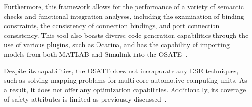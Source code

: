 Furthermore, this framework allows for the performance of a variety of semantic checks and functional integration analyses, including the examination of binding constraints, the consistency of connection bindings, and port connection consistency. This tool also boasts diverse code generation capabilities through the use of various plugins, such as Ocarina, and has the capability of importing models from both MATLAB and Simulink into the OSATE~\cite{ocarina,ocarinapaper,MATLAB:2010}.





Despite its capabilities, the OSATE does not incorporate any DSE techniques, such as solving mapping problems for multi-core automotive computing units. As a result, it does not offer any optimization capabilities. Additionally, its coverage of safety attributes is limited as previously discussed~\cite{askaripoor2022architecture}.





